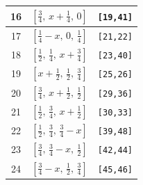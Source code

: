 \documentclass[fleqn,8pt]{jsarticle}
\begin{document}
\begin{longtable}{ccc}
16 & $\left[ \frac{3}{4},\, x + \frac{1}{4},\, 0 \right]$ & {\tt [19,41]} \\ \hline
17 & $\left[ \frac{1}{4} - x,\, 0,\, \frac{1}{4} \right]$ & {\tt [21,22]} \\ \hline
18 & $\left[ \frac{1}{2},\, \frac{1}{4},\, x + \frac{3}{4} \right]$ & {\tt [23,40]} \\ \hline
19 & $\left[ x + \frac{1}{2},\, \frac{1}{2},\, \frac{3}{4} \right]$ & {\tt [25,26]} \\ \hline
20 & $\left[ \frac{3}{4},\, x + \frac{1}{2},\, \frac{1}{2} \right]$ & {\tt [29,36]} \\ \hline
21 & $\left[ \frac{1}{2},\, \frac{3}{4},\, x + \frac{1}{2} \right]$ & {\tt [30,33]} \\ \hline
22 & $\left[ \frac{1}{2},\, \frac{3}{4},\, \frac{3}{4} - x \right]$ & {\tt [39,48]} \\ \hline
23 & $\left[ \frac{3}{4},\, \frac{3}{4} - x,\, \frac{1}{2} \right]$ & {\tt [42,44]} \\ \hline
24 & $\left[ \frac{3}{4} - x,\, \frac{1}{2},\, \frac{3}{4} \right]$ & {\tt [45,46]} \\
\end{longtable}
\renewcommand{\arraystretch}{1.2}
\end{document}
